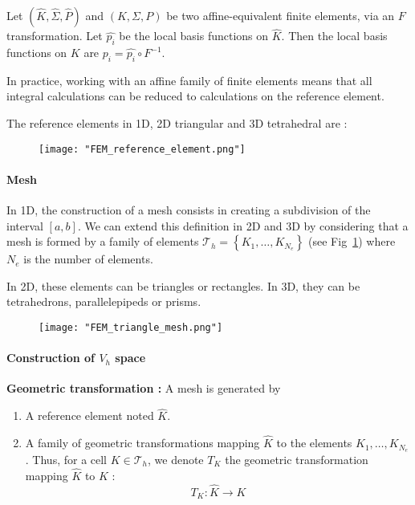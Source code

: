 	\begin{Rem}
		Let $(\hat{K},\hat{\Sigma},\hat{P})$ and $(K,\Sigma,P)$ be two affine-equivalent finite elements, via an $F$ transformation. Let $\hat{p_i}$ be the local basis functions on $\hat{K}$. Then the local basis functions on $K$ are $p_i=\hat{p_i}\circ F^{-1}$.
	\end{Rem}
		
	\begin{Rem}
		In practice, working with an affine family of finite elements means that all integral calculations can be reduced to calculations on the reference element. 
		
		The reference elements in 1D, 2D triangular and 3D tetrahedral are :
		\begin{figure}[H]
			\centering
			\texttt{[image: "FEM\_reference\_element.png"]}
		\end{figure}
	\end{Rem}

\paragraph{Mesh}

In 1D, the construction of a mesh consists in creating a subdivision of the interval $[a,b]$. We can extend this definition in 2D and 3D by considering that a mesh is formed by a family of elements $\mathcal{T}_h = \left\{K_1,\dots,K_{N_e}\right\}$ (see Fig~\ref{triangle_mesh}) where $N_e$ is the number of elements. 

In 2D, these elements can be triangles or rectangles. In 3D, they can be tetrahedrons, parallelepipeds or prisms.

\begin{figure}[H]
	\centering
	\texttt{[image: "FEM\_triangle\_mesh.png"]}
	\label{triangle_mesh}
\end{figure}

\paragraph{Construction of $V_h$ space}

\textbf{Geometric transformation :}
A mesh is generated by
\begin{enumerate}[label=\textbullet]
	\item A reference element noted $\hat{K}$.
	\item A family of geometric transformations mapping $\hat{K}$ to the elements $K_1,\dots,K_{N_e}$. Thus, for a cell $K\in\mathcal{T}_h$, we denote $T_K$ the geometric transformation mapping $\hat{K}$ to $K$ :
	\begin{equation*}
	T_K : \hat{K}\rightarrow K
	\end{equation*}
\end{enumerate}

